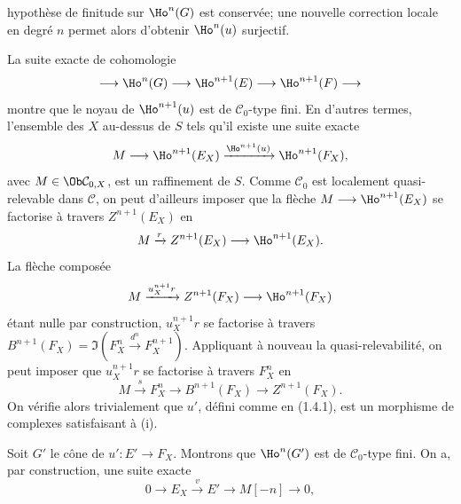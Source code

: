 hypothèse de finitude sur \(\Ho^n(G)\) est conservée; une nouvelle correction locale en degré \(n\) permet alors d'obtenir \(\Ho^n(u)\) surjectif.

La suite exacte de cohomologie
\[
  \longrightarrow \Ho^n(G)\longrightarrow
  \Ho^{n+1}(E)\longrightarrow
  \Ho^{n+1}(F)\longrightarrow
\]
montre que le noyau de \(\Ho^{n+1}(u)\) est de \(\mathcal C_0\)-type fini. En d'autres termes, l'ensemble des \(X\) au-dessus de \(S\) tels qu'il existe une suite exacte
\[
  M\longrightarrow \Ho^{n+1}(E_X)
  \xrightarrow{\Ho^{n+1}(u)}
  \Ho^{n+1}(F_X),
\]
avec \(M\in\Ob\mathcal C_{0,X}\), est un raffinement de \(S\). Comme \(\mathcal C_0\) est localement quasi-relevable dans \(\mathcal C\), on peut d'ailleurs imposer que la flèche \(M\longrightarrow \Ho^{n+1}(E_X)\) se factorise à travers \(Z^{n+1}(E_X)\) en
\[
  M\xrightarrow{r}Z^{n+1}(E_X)\longrightarrow \Ho^{n+1}(E_X).
\]
La flèche composée
\[
  M\xrightarrow{u_X^{n+1}r}Z^{n+1}(F_X)\longrightarrow \Ho^{n+1}(F_X)
\]
étant nulle par construction, \(u_X^{n+1}r\) se factorise à travers \(B^{n+1}(F_X)=\Im\!\left(F_X^n\xrightarrow{d^n}F_X^{n+1}\right)\). Appliquant à nouveau la quasi-relevabilité, on peut imposer que \(u_X^{n+1}r\) se factorise à travers \(F_X^n\) en
\[
  M\xrightarrow{s}F_X^n\longrightarrow B^{n+1}(F_X)\longrightarrow Z^{n+1}(F_X).
\]
On vérifie alors trivialement que \(u'\), défini comme en (1.4.1), est un morphisme de complexes satisfaisant à (i).

Soit \(G'\) le cône de \(u':E'\to F_X\). Montrons que \(\Ho^n(G')\) est de \(\mathcal C_0\)-type fini. On a, par construction, une suite exacte
\[
  0\longrightarrow E_X\xrightarrow{v}E'\longrightarrow M[-n]\longrightarrow 0,
\]
